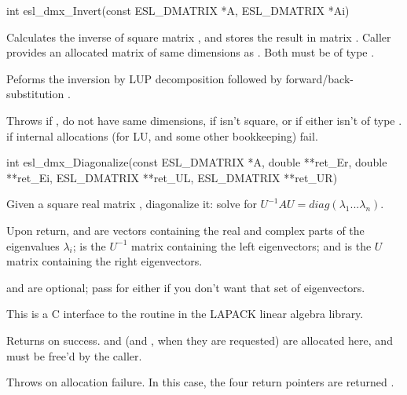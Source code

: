 \begin{sreapi}
\hypertarget{func:esl_dmx_Invert()}
{\item[int esl\_dmx\_Invert(const ESL\_DMATRIX *A, ESL\_DMATRIX *Ai)]}

Calculates the inverse of square matrix , and stores the
result in matrix . Caller provides an allocated
matrix  of same dimensions as . Both must be
of type .

Peforms the inversion by LUP decomposition followed by 
forward/back-substitution \citep[p.~753]{Cormen99}.

Throws  if ,  do not have same dimensions, 
if  isn't square, or if either isn't of
type .
   if internal allocations (for LU, and some other
bookkeeping) fail.


\hypertarget{func:esl_dmx_Diagonalize()}
{\item[int esl\_dmx\_Diagonalize(const ESL\_DMATRIX *A, double **ret\_Er, double **ret\_Ei, 
		    ESL\_DMATRIX **ret\_UL, ESL\_DMATRIX **ret\_UR)]}

Given a square real matrix , diagonalize it:
solve for $U^{-1} A U = diag(\lambda_1... \lambda_n)$.

Upon return,  and  are vectors
containing the real and complex parts of the eigenvalues
$\lambda_i$;  is the $U^{-1}$ matrix containing
the left eigenvectors; and  is the $U$ matrix
containing the right eigenvectors.

 and  are optional; pass  for
either if you don't want that set of eigenvectors.

This is a C interface to the  routine in the
LAPACK linear algebra library.

Returns  on success.
 and  (and , when they are
requested) are allocated here, and must be free'd by the caller.

Throws  on allocation failure.
In this case, the four return pointers are returned .



\end{sreapi}

